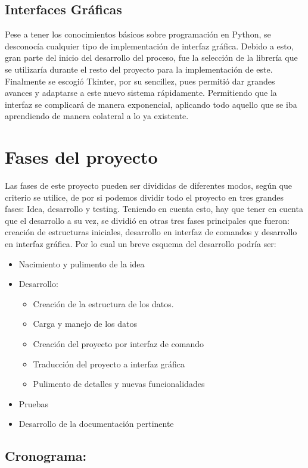 \subsection{Interfaces Gráficas}
Pese a tener los conocimientos básicos sobre programación en Python, se desconocía cualquier tipo de implementación de interfaz gráfica. Debido a esto, gran parte del inicio del desarrollo del proceso, fue la selección de la librería que se utilizaría durante el resto del proyecto para la implementación de este.\\
Finalmente se escogió Tkinter, por su sencillez, pues permitió dar grandes avances y adaptarse a este nuevo sistema rápidamente. Permitiendo que la interfaz se complicará de manera exponencial, aplicando todo aquello que se iba aprendiendo de manera colateral a lo ya existente.
\section{Fases del proyecto}
Las fases de este proyecto pueden ser divididas de diferentes modos, según que criterio se utilice, de por si podemos dividir todo el proyecto en tres grandes fases: Idea, desarrollo y testing. Teniendo en cuenta esto, hay que tener en cuenta que el desarrollo a su vez, se dividió en otras tres fases principales que fueron: creación de estructuras iniciales, desarrollo en interfaz de comandos y desarrollo en interfaz gráfica. 
Por lo cual un breve esquema del desarrollo podría ser:
\begin{itemize}
\item Nacimiento y pulimento de la idea
\item Desarrollo:
\begin{itemize}
\item Creación de la estructura de los datos.
\item Carga y manejo de los datos
\item Creación del proyecto por interfaz de comando
\item Traducción del proyecto a interfaz gráfica
\item Pulimento de detalles y nuevas funcionalidades
\end{itemize}
\item Pruebas
\item Desarrollo de la documentación pertinente
\end{itemize}
\subsection{Cronograma: }
